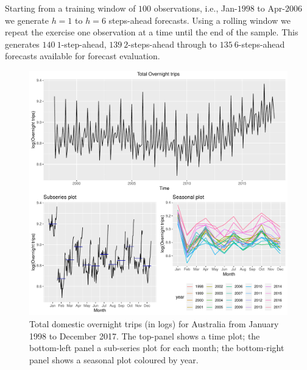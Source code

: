 \documentclass[12pt]{article}
\theoremstyle{definition}
\theoremstyle{property}
\begin{document}
Starting from a training window of $100$ observations, i.e., Jan-$1998$ to Apr-$2006$ we generate $h=1$ to $h=6$ steps-ahead forecasts. Using a rolling window we repeat the exercise one observation at a time until the end of the sample. This generates $140~1$-step-ahead, $139~2$-steps-ahead through to $135~6$-steps-ahead forecasts available for forecast evaluation.
		
	\begin{figure}
		\centering
		\small
		\includegraphics[width = \textwidth]{Empirical-results/TS-plots/Total_TSplots.pdf}
		\caption{Total domestic overnight trips (in logs) for Australia from January 1998 to December 2017. The top-panel shows a time plot; the bottom-left panel a sub-series plot for each month; the bottom-right panel shows a seasonal plot coloured by year.} \label{fig:Total_TSplots}
	\end{figure}
	
\end{document}
